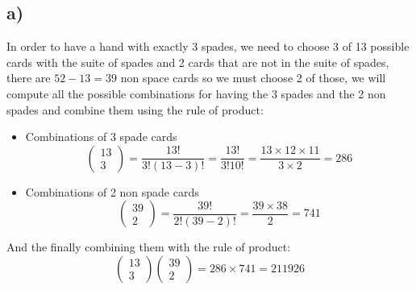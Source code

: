\documentclass{article}
\begin{document}
\subsection*{a)}
In order to have a hand with exactly 3 spades, we need to choose 3 of 13 possible cards with the suite of spades and 2 cards that are not in the suite of spades, there are $52-13=39$ non space cards so we must choose 2 of those, we will compute all the possible combinations for having the 3 spades and the 2 non spades and combine them using the rule of product:
\begin{itemize}
\item Combinations of 3 spade cards $$\begin{pmatrix}
    13\\3
\end{pmatrix}=\frac{13!}{3!(13-3)!}=\frac{13!}{3!10!}=\frac{13\times 12\times 11}{3\times 2}=286$$


\item Combinations of 2 non spade cards $$\begin{pmatrix}
    39\\2
\end{pmatrix}=\frac{39!}{2!(39-2)!}=\frac{39\times 38}{2}=741$$
\end{itemize}
And the finally combining them with the rule of product: $$\begin{pmatrix}
    13\\3
\end{pmatrix}\begin{pmatrix}
    39\\2
\end{pmatrix}=286\times 741=\boxed{211926}$$
\end{document}
